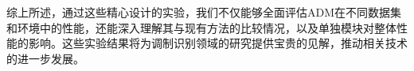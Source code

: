综上所述，通过这些精心设计的实验，我们不仅能够全面评估ADM在不同数据集和环境中的性能，还能深入理解其与现有方法的比较情况，以及单独模块对整体性能的影响。这些实验结果将为调制识别领域的研究提供宝贵的见解，推动相关技术的进一步发展。







